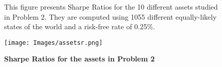 \documentclass[12pt]{article}
\DeclareMathOperator*{\argmin}{arg\,min}
\begin{document}



\clearpage




\clearpage

\begin{figure}[h]
\caption{\textbf{Sharpe Ratios for the assets in Problem 2}} \label{figure_srs}
\small{This figure presents Sharpe Ratios for the 10 different assets studied in Problem 2. They are computed using 1055 different equally-likely states of the world and a risk-free rate of 0.25\%.
}

\vspace{12pt}
\texttt{[image: Images/assetsr.png]}
\end{figure}
\end{document}
